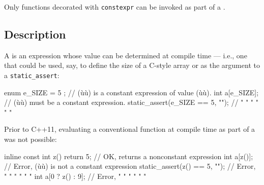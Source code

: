 
\label{compile-time-invocable-functions}
\setcounter{table}{0}
\setcounter{footnote}{0}
\setcounter{lstlisting}{0}



Only functions decorated with \lstinline!constexpr! can be invoked as part
of a .

\subsection[Description]{Description}\label{description}

A  is an expression whose value can be
determined at compile time --- i.e., one that could be used, say, to
define the size of a C-style array or as the argument to a
\lstinline!static_assert!:

\begin{emcppslisting}
enum { e_SIZE = 5 };             // (ù{}ù) is a constant expression of value (ù{}ù).
int a[e_SIZE];                   // (ù{}ù) must be a constant expression.
static_assert(e_SIZE == 5, "");  //    "     "   " "     "          "
\end{emcppslisting}
    
\noindent Prior to C++11, evaluating a conventional function at compile time as
part of a  was not possible:

\begin{emcppslisting}
inline const int z() { return 5; }  // OK, returns a nonconstant expression
int a[z()];                         // Error, (ù{}ù) is not a constant expression
static_assert(z() == 5, "");        // Error,  "     "  "  "      "         "
int a[0 ? z() : 9];                 // Error,  "     "  "  "      "         "
\end{emcppslisting}
    
